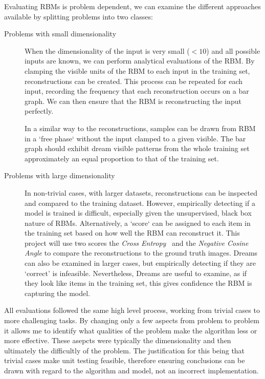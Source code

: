   Evaluating RBMs is problem dependent, we can examine the different approaches available by splitting problems into two classes:
  \begin{description}
  \item[Problems with small dimensionality] When the dimensionality of the input is very small ($<10$) and all possible inputs are known, we can perform analytical evaluations of the RBM. By clamping the visible units of the RBM to each input in the training set, reconstructions can be created. This process can be repeated for each input, recording the frequency that each reconstruction occurs on a bar graph. We can then ensure that the RBM is reconstructing the input perfectly.

  In a similar way to the reconstructions, samples can be drawn from RBM in a `free phase` without the input clamped to a given visible. The bar graph should exhibit dream visible patterns from the whole training set approximately an equal proportion to that of the training set.

  \item[Problems with large dimensionality] In non-trivial cases, with larger datasets, reconstructions can be inspected and compared to the training dataset. However, empirically detecting if a model is trained is difficult, especially given the unsupervised, black box nature of RBMs.
  Alternatively, a `score` can be assigned to each item in the training set based on how well the RBM can reconstruct it.
  This project will use two scores the \emph{Cross Entropy}~\cite{golik2013cross} and the \emph{Negative Cosine Angle} to compare the reconstructions to the ground truth images.
  Dreams can also be examined in larger cases, but empirically detecting if they are `correct' is infeasible. Nevertheless, Dreams are useful to examine, as if they look like items in the training set, this gives confidence the RBM is capturing the model.

\end{description}

All evaluations followed the same high level process, working from trivial cases to more challenging tasks. By changing only a few aspects from problem to problem it allows me to identify what qualities of the problem make the algorithm less or more effective. These asepcts were typically the dimensionality and then ultimately the difficultly of the problem. The justification for this being that trivial cases make unit testing feasible, therefore ensuring conclusions can be drawn with regard to the algorithm and model, not an incorrect implementation.

